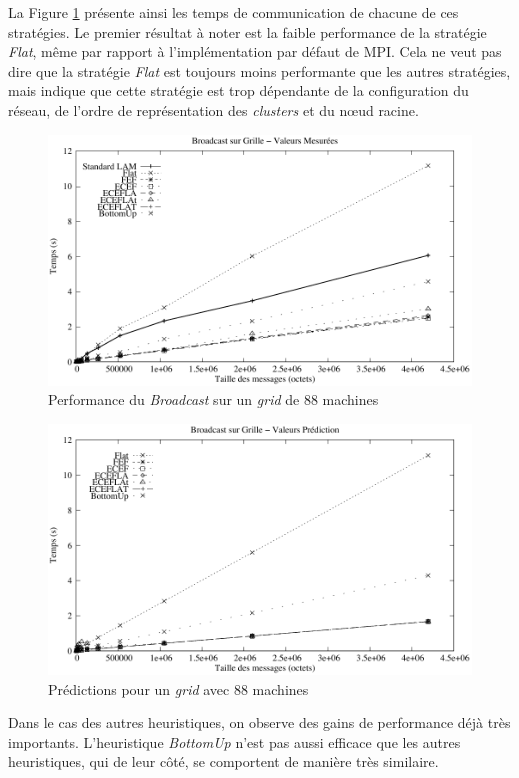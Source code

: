 La Figure \ref{Figure: Bcast - Case1 - Mesure} présente ainsi les temps de communication de chacune de ces stratégies. Le premier résultat à noter est la faible performance de la stratégie
\textit{Flat}, même par rapport à l'implémentation par défaut de MPI. Cela
ne veut pas dire que la stratégie \textit{Flat} est toujours moins performante
que les autres stratégies, mais indique que cette stratégie est trop
dépendante de la configuration du réseau, de l'ordre de représentation
des \textit{clusters} et du n{\oe}ud racine.
%
\begin{figure}[h]
	\centering
		\includegraphics[width=0.7\linewidth]{images/Grid/Bcast/case1/comp}
	\caption{\label{Figure: Bcast - Case1 - Mesure}Performance du \textit{Broadcast} sur
		un \textit{grid} de 88 machines }	
\end{figure}

\begin{figure}[h]
	\centering
		\includegraphics[width=0.7\linewidth]{images/Grid/Bcast/case1/simul}	
	\caption{\label{Figure: Bcastcase1predictions}Prédictions pour un \textit{grid}
		avec 88 machines}
	
\end{figure}

Dans le cas des autres heuristiques, on observe des gains de performance
déjà très importants. L'heuristique \textit{BottomUp} %
n'est pas aussi efficace que les autres heuristiques,
qui de leur côté, se comportent de manière très similaire.

